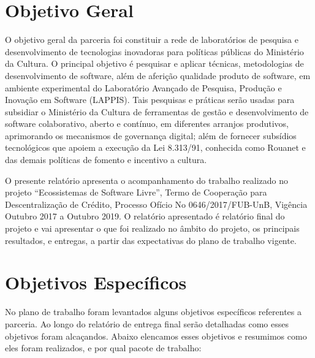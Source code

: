 \hypertarget{objetivo-geral}{%
\section{Objetivo Geral}\label{objetivo-geral}}

O objetivo geral da parceria foi constituir a rede de laboratórios de
pesquisa e desenvolvimento de tecnologias inovadoras para políticas
públicas do Ministério da Cultura. O principal objetivo é pesquisar e
aplicar técnicas, metodologias de desenvolvimento de software, além de
aferição qualidade produto de software, em ambiente experimental do
Laboratório Avançado de Pesquisa, Produção e Inovação em Software
(LAPPIS). Tais pesquisas e práticas serão usadas para subsidiar o
Ministério da Cultura de ferramentas de gestão e desenvolvimento de
software colaborativo, aberto e contínuo, em diferentes arranjos
produtivos, aprimorando os mecanismos de governança digital; além de
fornecer subsídios tecnológicos que apoiem a execução da Lei 8.313/91,
conhecida como Rouanet e das demais políticas de fomento e incentivo a
cultura.

O presente relatório apresenta o acompanhamento do trabalho realizado no
projeto ``Ecossistemas de Software Livre'', Termo de Cooperação para
Descentralização de Crédito, Processo Ofício No 0646/2017/FUB-UnB,
Vigência Outubro 2017 a Outubro 2019. O relatório apresentado é
relatório final do projeto e vai apresentar o que foi realizado no
âmbito do projeto, os principais resultados, e entregas, a partir das
expectativas do plano de trabalho vigente.

\hypertarget{objetivos-especuxedficos}{%
\section{Objetivos Específicos}\label{objetivos-especuxedficos}}

No plano de trabalho foram levantados alguns objetivos específicos
referentes a parceria. Ao longo do relatório de entrega final serão
detalhadas como esses objetivos foram alcaçandos. Abaixo elencamos esses
objetivos e resumimos como eles foram realizados, e por qual pacote de
trabalho:

